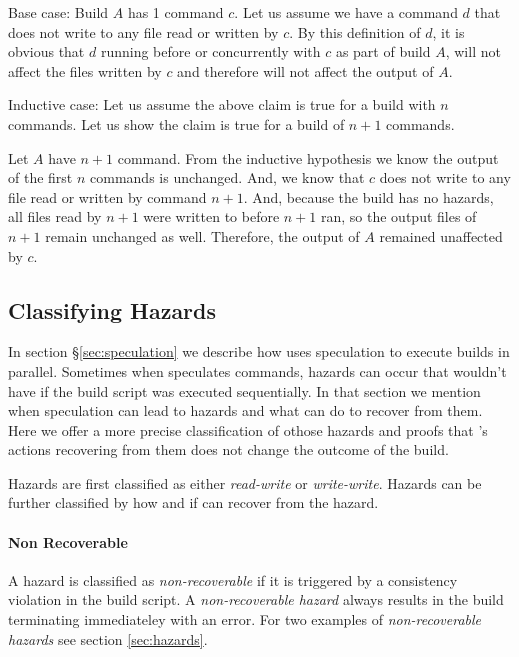 Base case:  Build $A$ has 1 command $c$.  Let us assume we have a command $d$ that does not write to any file read or written by $c$.  By this definition of $d$, it is obvious that $d$ running before or
concurrently with $c$ as part of build $A$, will not affect the files written by $c$ and therefore will not affect the output of $A$.

Inductive case: Let us assume the above claim is true for a build with $n$ commands.  Let us show the claim is true for a build of $n+1$ commands.

Let $A$ have $n+1$ command.  From the inductive hypothesis we know the output of the first $n$ commands is unchanged.  And, we know that $c$ does not write to any file read or written by command $n+1$.  And, because the build has no hazards, all files read by $n+1$ were written to before $n+1$ ran, so the output files of $n+1$ remain unchanged as well.  Therefore, the output of $A$ remained unaffected by $c$.

\subsection{Classifying Hazards}
\label{sec:proof:classify_hazard}


In section \S\ref{sec:speculation} we describe how \Rattle uses speculation to execute builds in parallel.  Sometimes when \Rattle speculates commands, hazards can occur that wouldn't have if the build script was executed sequentially.  In that section we mention when speculation can lead to hazards and what \Rattle can do to recover from them.  Here we offer a more precise classification of othose hazards and proofs that \Rattle's actions recovering from them does not change the outcome of the build.

Hazards are first classified as either \emph{read-write} or \emph{write-write}.  Hazards can be further classified by how and if \Rattle can recover from the hazard.  

\paragraph{Non Recoverable}
A hazard is classified as \emph{non-recoverable} if it is triggered by a consistency violation in the build script.  A \emph{non-recoverable hazard} always results in the build terminating immediateley with an error.  For two examples of \emph{non-recoverable hazards} see section \ref{sec:hazards}.

